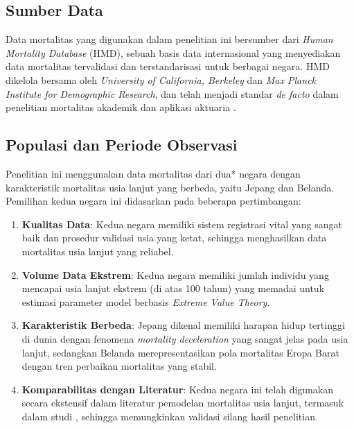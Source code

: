 \subsection{Sumber Data}

Data mortalitas yang digunakan dalam penelitian ini bersumber dari \textit{Human Mortality Database} (HMD), sebuah basis data internasional yang menyediakan data mortalitas tervalidasi dan terstandarisasi untuk berbagai negara. HMD dikelola bersama oleh \textit{University of California, Berkeley} dan \textit{Max Planck Institute for Demographic Research}, dan telah menjadi standar \textit{de facto} dalam penelitian mortalitas akademik dan aplikasi aktuaria \citep{HMD2023}.

\subsection{Populasi dan Periode Observasi}

Penelitian ini menggunakan data mortalitas dari dua* negara dengan karakteristik mortalitas usia lanjut yang berbeda, yaitu Jepang dan Belanda. Pemilihan kedua negara ini didasarkan pada beberapa pertimbangan:

\begin{enumerate}
    \item \textbf{Kualitas Data}: Kedua negara memiliki sistem registrasi vital yang sangat baik dan prosedur validasi usia yang ketat, sehingga menghasilkan data mortalitas usia lanjut yang reliabel.
    
    \item \textbf{Volume Data Ekstrem}: Kedua negara memiliki jumlah individu yang mencapai usia lanjut ekstrem (di atas 100 tahun) yang memadai untuk estimasi parameter model berbasis \textit{Extreme Value Theory}.
    
    \item \textbf{Karakteristik Berbeda}: Jepang dikenal memiliki harapan hidup tertinggi di dunia dengan fenomena \textit{mortality deceleration} yang sangat jelas pada usia lanjut, sedangkan Belanda merepresentasikan pola mortalitas Eropa Barat dengan tren perbaikan mortalitas yang stabil.
    
    \item \textbf{Komparabilitas dengan Literatur}: Kedua negara ini telah digunakan secara ekstensif dalam literatur pemodelan mortalitas usia lanjut, termasuk dalam studi \citet{Huang2020}, sehingga memungkinkan validasi silang hasil penelitian.
\end{enumerate}

